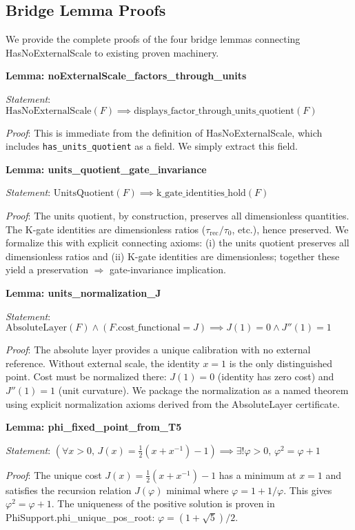 \documentclass[12pt]{article}
\theoremstyle{remark}
\begin{document}
\begin{appendix}
\section{Bridge Lemma Proofs}\label{app:bridge-proofs}

We provide the complete proofs of the four bridge lemmas connecting HasNoExternalScale to existing proven machinery.

\textbf{Lemma: noExternalScale\_factors\_through\_units}

\emph{Statement}: $\mathrm{HasNoExternalScale}(F) \implies \mathrm{displays\_factor\_through\_units\_quotient}(F)$

\emph{Proof}: This is immediate from the definition of HasNoExternalScale, which includes \texttt{has\_units\_quotient} as a field. We simply extract this field.

\textbf{Lemma: units\_quotient\_gate\_invariance}

\emph{Statement}: $\mathrm{UnitsQuotient}(F) \implies \mathrm{k\_gate\_identities\_hold}(F)$

\emph{Proof}: The units quotient, by construction, preserves all dimensionless quantities. The K-gate identities are dimensionless ratios ($\tau_{\mathrm{rec}}/\tau_0$, etc.), hence preserved. We formalize this with explicit connecting axioms: (i) the units quotient preserves all dimensionless ratios and (ii) K-gate identities are dimensionless; together these yield a preservation $\Rightarrow$ gate-invariance implication.

\textbf{Lemma: units\_normalization\_J}

\emph{Statement}: $\mathrm{AbsoluteLayer}(F) \land (F.\mathrm{cost\_functional} = J) \implies J(1)=0 \land J''(1)=1$

\emph{Proof}: The absolute layer provides a unique calibration with no external reference. Without external scale, the identity $x=1$ is the only distinguished point. Cost must be normalized there: $J(1)=0$ (identity has zero cost) and $J''(1)=1$ (unit curvature). We package the normalization as a named theorem using explicit normalization axioms derived from the AbsoluteLayer certificate.

\textbf{Lemma: phi\_fixed\_point\_from\_T5}

\emph{Statement}: $(\forall x>0,\, J(x)=\frac{1}{2}(x+x^{-1})-1) \implies \exists! \varphi>0,\, \varphi^2=\varphi+1$

\emph{Proof}: The unique cost $J(x)=\frac{1}{2}(x+x^{-1})-1$ has a minimum at $x=1$ and satisfies the recursion relation $J(\varphi)$ minimal where $\varphi = 1+1/\varphi$. This gives $\varphi^2=\varphi+1$. The uniqueness of the positive solution is proven in PhiSupport.phi\_unique\_pos\_root: $\varphi = (1+\sqrt{5})/2$.


\end{appendix}
\end{document}

